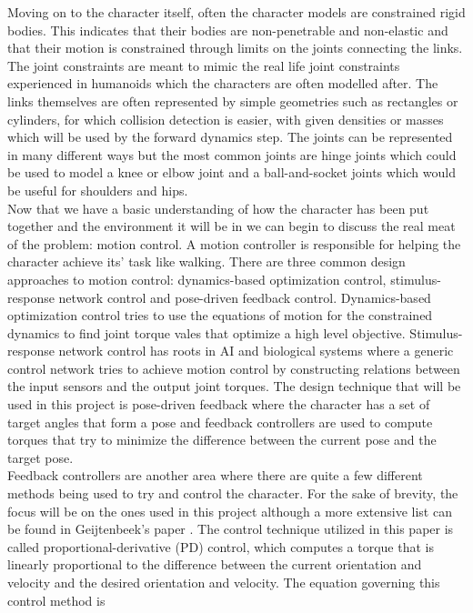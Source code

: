 \documentclass[12pt, a4paper]{article}
\begin{document}
Moving on to the character itself, often the character models are constrained rigid bodies. This indicates that their bodies are non-penetrable and non-elastic and that their motion is constrained through limits on the joints connecting the links. 
The joint constraints are meant to mimic the real life joint constraints experienced in humanoids which the characters are often modelled after. The links themselves are often represented by simple geometries such as rectangles or cylinders, for which collision detection is easier, with given densities or masses which will be used by the forward dynamics step. The joints can be represented in many different ways but the most common joints are hinge joints which could be used to model a knee or elbow joint and a ball-and-socket joints which would be useful for shoulders and hips.\\

Now that we have a basic understanding of how the character has been put together and the environment it will be in we can begin to discuss the real meat of the problem: motion control. A motion controller is responsible for helping the character achieve its' task like walking. There are three common design approaches to motion control: dynamics-based optimization control, stimulus-response network control and pose-driven feedback control. Dynamics-based optimization control tries to use the equations of motion for the constrained dynamics to find joint torque vales that optimize a high level objective. Stimulus-response network control has roots in AI and biological systems where a generic control network tries to achieve motion control by constructing relations between the input sensors and the output joint torques. The design technique that will be used in this project is pose-driven feedback where the character has a set of target angles that form a pose and feedback controllers are used to compute torques that try to minimize the difference between the current pose and the target pose. \\

Feedback controllers are another area where there are quite a few different methods being used to try and control the character. For the sake of brevity, the focus will be on the ones used in this project although a more extensive list can be found in Geijtenbeek's paper \cite{Geijtenbeek}. The control technique utilized in this paper is called proportional-derivative (PD) control, which computes a torque that is linearly proportional to the difference between the current orientation and velocity and the desired orientation and velocity. The equation governing  this control method is 
\end{document}
